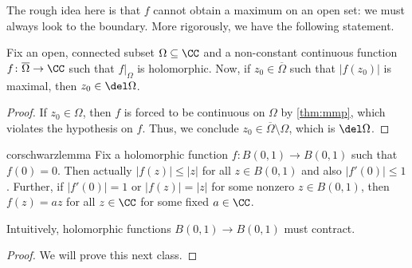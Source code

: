 \documentclass[../notes.tex]{subfiles}
\begin{document}
The rough idea here is that $f$ cannot obtain a maximum on an open set: we must always look to the boundary. More rigorously, we have the following statement.
\begin{corollary} \label{cor:mmp}
	Fix an open, connected subset $\Omega\subseteq\CC$ and a non-constant continuous function $f\colon \overline\Omega\to\CC$ such that $f|_\Omega$ is holomorphic. Now, if $z_0\in\overline\Omega$ such that $|f(z_0)|$ is maximal, then $z_0\in\del\Omega$.
\end{corollary}
\begin{proof}
	If $z_0\in\Omega$, then $f$ is forced to be continuous on $\Omega$ by \autoref{thm:mmp}, which violates the hypothesis on $f$. Thus, we conclude $z_0\in\overline\Omega\setminus\Omega$, which is $\del\Omega$.
\end{proof}
\begin{restatable}{cor}{schwarzlemma} \label{cor:schwarz}
	Fix a holomorphic function $f\colon B(0,1)\to B(0,1)$ such that $f(0)=0$. Then actually $|f(z)|\le|z|$ for all $z\in B(0,1)$ and also $|f'(0)|\le1$. Further, if $|f'(0)|=1$ or $|f(z)|=|z|$ for some nonzero $z\in B(0,1)$, then $f(z)=az$ for all $z\in\CC$ for some fixed $a\in\CC$.
\end{restatable}
Intuitively, holomorphic functions $B(0,1)\to B(0,1)$ must contract.
\begin{proof}
	We will prove this next class.
\end{proof}
\end{document}
